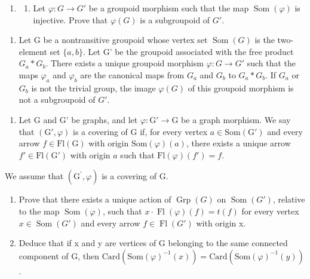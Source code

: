 \begin{enumerate}
\def\labelenumi{\arabic{enumi})}
\setcounter{enumi}{4}
\tightlist
\item
  \begin{enumerate}
  \def\labelenumii{\alph{enumii})}
  \tightlist
  \item
    Let \(\varphi\colon G\to G'\) be a groupoid morphism such that the map \(\operatorname{Som}(\varphi)\) is injective. Prove that \(\varphi(G)\) is a subgroupoid of \(G'\).
  \end{enumerate}
\end{enumerate}

\begin{enumerate}
\def\labelenumi{\alph{enumi})}
\setcounter{enumi}{1}
\tightlist
\item
  Let G be a nontransitive groupoid whose vertex set \(\operatorname{Som}(G)\) is the two-element set \(\{a,b\}\). Let G' be the groupoid associated with the free product \(G_a*G_b\). There exists a unique groupoid morphism \(\varphi:G\to G'\) such that the maps \(\varphi_a\) and \(\varphi_b\) are the canonical maps from \(G_a\) and \(G_b\) to \(G_a*G_b\). If \(G_a\) or \(G_b\) is not the trivial group, the image \(\varphi(G)\) of this groupoid morphism is not a subgroupoid of \(G'\).
\end{enumerate}

\begin{enumerate}
\def\labelenumi{\arabic{enumi})}
\setcounter{enumi}{5}
\tightlist
\item
  Let G and G' be graphs, and let \(\varphi\colon\mathrm{G}'\to\mathrm{G}\) be a graph morphism. We say that \((\mathrm{G}',\varphi)\) is a covering of G if, for every vertex \(a\in\mathrm{Som}(\mathrm{G}')\) and every arrow \(f\in\mathrm{Fl}(\mathrm{G})\) with origin \(\mathrm{Som}(\varphi)(a)\), there exists a unique arrow \(f'\in\mathrm{Fl}(\mathrm{G}')\) with origin \(a\) such that \(\mathrm{Fl}(\varphi)(f')=f\).
\end{enumerate}

We assume that \((\mathrm{G}^{\prime},\varphi)\) is a covering of G.

\begin{enumerate}
\def\labelenumi{\alph{enumi})}
\item
  Prove that there exists a unique action of \(\operatorname{Grp}(G)\) on \(\operatorname{Som}(G')\), relative to the map \(\operatorname{Som}(\varphi)\), such that \(x \cdot \operatorname{Fl}(\varphi)(f) = t(f)\) for every vertex \(x \in \operatorname{Som}(G')\) and every arrow \(f \in \operatorname{Fl}(G')\) with origin x.
\item
  Deduce that if x and y are vertices of G belonging to the same connected component of G, then \(\text{Card}(\text{Som}(\varphi)^{-1}(x)) = \text{Card}(\text{Som}(\varphi)^{-1}(y))\).
\end{enumerate}

